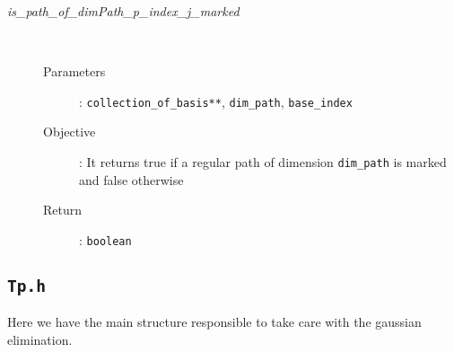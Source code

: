 \documentclass[11pt,a4paper]{article}
\begin{document}
\begin{description}
\begin{description}
		\end{description}
	\item [\textit{is\_path\_of\_dimPath\_p\_index\_j\_marked}] \hfill \\[-0.5cm]
		\begin{description}
			\item [Parameters]: \texttt{collection\_of\_basis**}, \texttt{dim\_path},
				\texttt{base\_index}
			\item [Objective]: It returns true if a regular path of dimension 
				\texttt{dim\_path} is marked and false otherwise 
			\item [Return]: \texttt{boolean}
		\end{description}
\end{description}


\subsection{\texttt{Tp.h}}
Here we have the main structure responsible to take care with the 
gaussian elimination.

\end{document}

